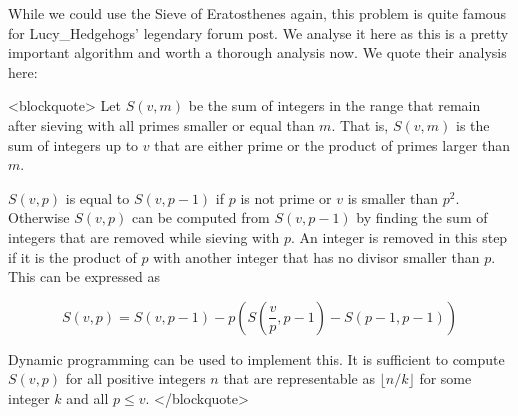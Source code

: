 While we could use the Sieve of Eratosthenes again, this problem is quite famous for Lucy_Hedgehogs' legendary forum post.
We analyse it here as this is a pretty important algorithm and worth a thorough analysis now. We quote their analysis here:

<blockquote>
Let $S(v, m)$ be the sum of integers in the range that remain after sieving with all primes smaller or equal than $m$.
That is, $S(v, m)$ is the sum of integers up to $v$ that are either prime or the product of primes larger than $m$.

$S(v, p)$ is equal to $S(v, p-1)$ if $p$ is not prime or $v$ is smaller than $p^2$. Otherwise $S(v, p)$ can be computed
from $S(v, p-1)$ by finding the sum of integers that are removed while sieving with $p$. An integer is removed in this
step if it is the product of $p$ with another integer that has no divisor smaller than $p$. This can be expressed as

$$S(v, p)=S(v, p-1)-p\left(S\left(\frac{v}{p}, p-1\right)-S(p-1, p-1)\right)$$

Dynamic programming can be used to implement this. It is sufficient to compute $S(v, p)$ for all positive integers $n$
that are representable as $\lfloor n/k\rfloor$ for some integer $k$ and all $p\le v$.
</blockquote>